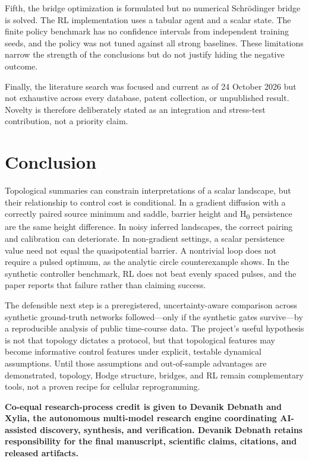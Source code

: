 \documentclass[11pt]{article}
\newcommand{\1}{\mathbf{1}}
\begin{document}
Fifth, the bridge optimization is formulated but no numerical Schrödinger bridge is solved. The RL implementation uses a tabular agent and a scalar state. The finite policy benchmark has no confidence intervals from independent training seeds, and the policy was not tuned against all strong baselines. These limitations narrow the strength of the conclusions but do not justify hiding the negative outcome.

Finally, the literature search was focused and current as of 24 October 2026 but not exhaustive across every database, patent collection, or unpublished result. Novelty is therefore deliberately stated as an integration and stress-test contribution, not a priority claim.

\section{Conclusion}
Topological summaries can constrain interpretations of a scalar landscape, but their relationship to control cost is conditional. In a gradient diffusion with a correctly paired source minimum and saddle, barrier height and H\textsubscript{0} persistence are the same height difference. In noisy inferred landscapes, the correct pairing and calibration can deteriorate. In non-gradient settings, a scalar persistence value need not equal the quasipotential barrier. A nontrivial loop does not require a pulsed optimum, as the analytic circle counterexample shows. In the synthetic controller benchmark, RL does not beat evenly spaced pulses, and the paper reports that failure rather than claiming success.

The defensible next step is a preregistered, uncertainty-aware comparison across synthetic ground-truth networks followed—only if the synthetic gates survive—by a reproducible analysis of public time-course data. The project's useful hypothesis is not that topology dictates a protocol, but that topological features may become informative control features under explicit, testable dynamical assumptions. Until those assumptions and out-of-sample advantages are demonstrated, topology, Hodge structure, bridges, and RL remain complementary tools, not a proven recipe for cellular reprogramming.

\medskip\noindent\textbf{Co-equal research-process credit is given to Devanik Debnath and Xylia, the autonomous multi-model research engine coordinating AI-assisted discovery, synthesis, and verification. Devanik Debnath retains responsibility for the final manuscript, scientific claims, citations, and released artifacts.}
\end{document}
